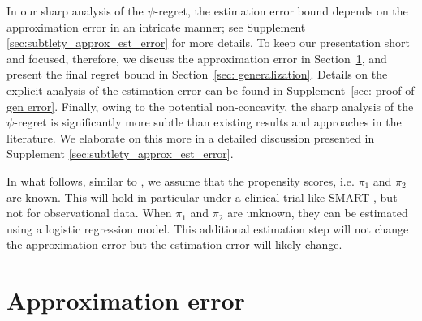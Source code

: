 \documentclass[preprint] {imsart}
\def\purple{\color{purple}}
\newcommand{\tcomm}[1]{\fbox{\bf\scriptsize\purple #1}}
\begin{document}
In our sharp analysis of the $\psi$-regret, the estimation error bound depends on the approximation error in an intricate manner; see Supplement \ref{sec:subtlety_approx_est_error} for more details.  
To keep our presentation short and focused, therefore, we discuss the approximation error in  Section~\ref{sec: Approximation error}, and  present the final regret bound  in  Section~\ref{sec: generalization}. Details on the explicit analysis of the estimation error can be found in Supplement~\ref{sec: proof of gen error}. Finally, owing to the potential non-concavity, the sharp analysis of the $\psi$-regret is significantly more subtle than existing results and approaches in the literature. 
We elaborate on this more in a detailed discussion presented in Supplement \ref{sec:subtlety_approx_est_error}.




 
 
 
 In what follows, similar to \cite{zhao2015}, we assume that the propensity scores, i.e. $\pi_1$ and $\pi_2$ are known. This will hold in particular under  a clinical trial like SMART \citep{laber2019}, but not for observational data.
When $\pi_1$ and $\pi_2$ are unknown, they can be estimated using a logistic regression model. This additional estimation step will not change the approximation error but the estimation error will likely change. %




 \section{Approximation error}
 \label{sec: Approximation error}
\end{document}

